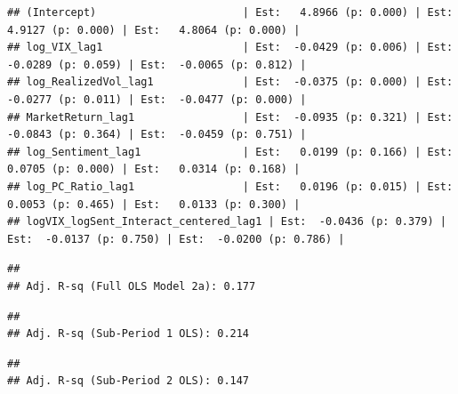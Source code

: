 \documentclass[
]{article}
\begin{document}
\begin{verbatim}
## (Intercept)                       | Est:   4.8966 (p: 0.000) | Est:   4.9127 (p: 0.000) | Est:   4.8064 (p: 0.000) |
## log_VIX_lag1                      | Est:  -0.0429 (p: 0.006) | Est:  -0.0289 (p: 0.059) | Est:  -0.0065 (p: 0.812) |
## log_RealizedVol_lag1              | Est:  -0.0375 (p: 0.000) | Est:  -0.0277 (p: 0.011) | Est:  -0.0477 (p: 0.000) |
## MarketReturn_lag1                 | Est:  -0.0935 (p: 0.321) | Est:  -0.0843 (p: 0.364) | Est:  -0.0459 (p: 0.751) |
## log_Sentiment_lag1                | Est:   0.0199 (p: 0.166) | Est:   0.0705 (p: 0.000) | Est:   0.0314 (p: 0.168) |
## log_PC_Ratio_lag1                 | Est:   0.0196 (p: 0.015) | Est:   0.0053 (p: 0.465) | Est:   0.0133 (p: 0.300) |
## logVIX_logSent_Interact_centered_lag1 | Est:  -0.0436 (p: 0.379) | Est:  -0.0137 (p: 0.750) | Est:  -0.0200 (p: 0.786) |
\end{verbatim}

\begin{verbatim}
## 
## Adj. R-sq (Full OLS Model 2a): 0.177
\end{verbatim}

\begin{verbatim}
## 
## Adj. R-sq (Sub-Period 1 OLS): 0.214
\end{verbatim}

\begin{verbatim}
## 
## Adj. R-sq (Sub-Period 2 OLS): 0.147
\end{verbatim}
\end{document}

